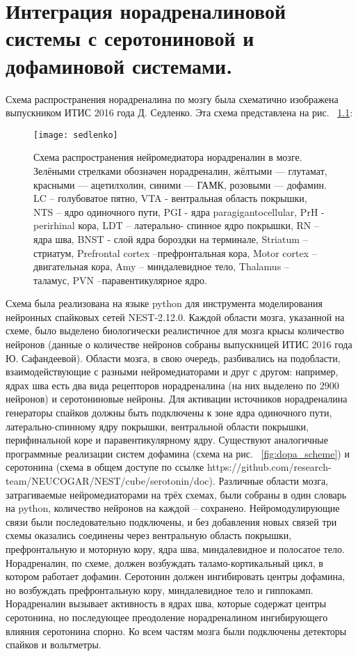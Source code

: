 \chapter{Интеграция норадреналиновой системы с серотониновой и дофаминовой системами.}
\label{chap:implementation}
Схема распространения норадреналина по мозгу была схематично изображена выпускником ИТИС 2016 года Д. Седленко. Эта схема представлена на рис. ~\ref{fig:nora_scheme}:


\begin{figure}
	\centering
	\texttt{[image: sedlenko]}
	\caption{Схема распространения нейромедиатора норадреналин в мозге. Зелёными стрелками обозначен норадреналин, жёлтыми — глутамат, красными — ацетилхолин, синими — ГАМК, розовыми — дофамин. LC – голубоватое пятно, VTA - вентральная область покрышки, NTS – ядро одиночного пути, PGI - ядра paragigantocellular, PrH - perirhinal кора, LDT – латерально- спинное ядро покрышки, RN – ядра шва, BNST - слой ядра бороздки на терминале, Striatum – стриатум, Prefrontal cortex –префронтальная кора, Motor cortex –двигательная кора, Amy – миндалевидное тело, Thalamus – таламус, PVN –паравентикулярное ядро.}
	\label{fig:nora_scheme}
\end{figure}

Схема была реализована на языке python для инструмента моделирования нейронных спайковых сетей NEST-2.12.0. Каждой области мозга, указанной на схеме, было выделено биологически реалистичное для мозга крысы количество нейронов (данные о количестве нейронов собраны выпускницей ИТИС 2016 года Ю. Сафандеевой). Области мозга, в свою очередь, разбивались на подобласти, взаимодействующие с разными нейромедиаторами и друг с другом: например, ядрах шва есть два вида рецепторов норадреналина (на них выделено по 2900 нейронов) и серотониновые нейроны. Для активации источников норадреналина генераторы спайков должны быть подключены к зоне ядра одиночного пути, латерально-спинному ядру покрышки, вентральной области покрышки, перифинальной коре и паравентикулярному ядру.
Существуют аналогичные программные реализации систем дофамина (схема на рис. ~\ref{fig:dopa_scheme}) и серотонина (схема в общем доступе по ссылке https://github.com/research-team/NEUCOGAR/NEST/cube/serotonin/doc). Различные области мозга, затрагиваемые нейромедиаторами на трёх схемах, были собраны в один словарь на python, количество нейронов на каждой – сохранено. Нейромодулирующие связи были последовательно подключены, и без добавления новых связей три схемы оказались соединены через вентральную область покрышки, префронтальную и моторную кору, ядра шва, миндалевидное и полосатое тело. Норадреналин, по схеме, должен возбуждать таламо-кортикальный цикл, в котором работает дофамин. Серотонин должен ингибировать центры дофамина, но возбуждать префронтальную кору, миндалевидное тело и гиппокамп. Норадреналин вызывает активность в ядрах шва, которые содержат центры серотонина, но последующее преодоление норадреналином ингибирующего влияния серотонина спорно. Ко всем частям мозга были подключены детекторы спайков и вольтметры.


